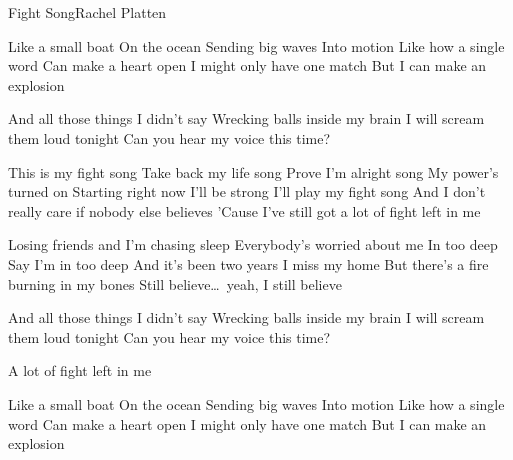 \documentclass[a4paper,11pt,french]{article}
\begin{document}

\begin{Song}{Fight Song}{Rachel Platten}
\begin{multicols}{2}

\begin{Verse}
Like a small boat
On the ocean
Sending big waves
Into motion
Like how a single word
Can make a heart open
I might only have one match
But I can make an explosion
\end{Verse}
\espaceInterStrophe

\begin{PreChorus}
And all those things I didn't say
Wrecking balls inside my brain
I will scream them loud tonight
Can you hear my voice this time?
\end{PreChorus}
\espaceInterStrophe

\begin{Chorus}
This is my fight song
Take back my life song
Prove I'm alright song
My power's turned on
Starting right now I'll be strong
I'll play my fight song
And I don't really care if nobody else believes
'Cause I've still got a lot of fight left in me
\end{Chorus}
\vfill
\columnbreak

\begin{Verse}
Losing friends and I'm chasing sleep
Everybody's worried about me
In too deep
Say I'm in too deep 
And it's been two years
I miss my home
But there's a fire burning in my bones
Still believe\dots\ yeah, I still believe
\end{Verse}
\espaceInterStrophe

\begin{PreChorus}
And all those things I didn't say
Wrecking balls inside my brain
I will scream them loud tonight
Can you hear my voice this time?
\end{PreChorus}
\espaceInterStrophe

\tochorus
\espaceInterStrophe

A lot of fight left in me
\espaceInterStrophe

\begin{Verse}
Like a small boat
On the ocean
Sending big waves
Into motion
Like how a single word
Can make a heart open
I might only have one match
But I can make an explosion
\end{Verse}
\espaceInterStrophe

\espaceInterStrophe


\end{multicols}
\end{Song}
\end{document}

